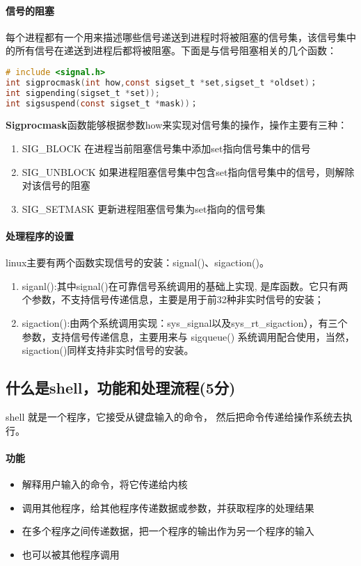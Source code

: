 \paragraph{信号的阻塞}每个进程都有一个用来描述哪些信号递送到进程时将被阻塞的信号集，该信号集中的所有信号在递送到进程后都将被阻塞。下面是与信号阻塞相关的几个函数：

\begin{lstlisting}[language = c]
# include <signal.h>
int sigprocmask(int how,const sigset_t *set,sigset_t *oldset)；
int sigpending(sigset_t *set));
int sigsuspend(const sigset_t *mask))；
\end{lstlisting}

\textbf{Sigprocmask}函数能够根据参数how来实现对信号集的操作，操作主要有三种：

\begin{enumerate}
    \item SIG\_BLOCK	在进程当前阻塞信号集中添加set指向信号集中的信号
    \item SIG\_UNBLOCK	如果进程阻塞信号集中包含set指向信号集中的信号，则解除对该信号的阻塞
    \item SIG\_SETMASK	更新进程阻塞信号集为set指向的信号集
\end{enumerate}

\paragraph{处理程序的设置}linux主要有两个函数实现信号的安装：signal()、sigaction()。
\begin{enumerate}
\item siganl():其中signal()在可靠信号系统调用的基础上实现, 是库函数。它只有两个参数，不支持信号传递信息，主要是用于前32种非实时信号的安装；
\item sigaction():由两个系统调用实现：sys\_signal以及sys\_rt\_sigaction），有三个参数，支持信号传递信息，主要用来与 sigqueue() 系统调用配合使用，当然，sigaction()同样支持非实时信号的安装。
\end{enumerate}

\subsection{什么是shell，功能和处理流程(5分)}
shell 就是一个程序，它接受从键盘输入的命令， 然后把命令传递给操作系统去执行。
\paragraph{功能}
\begin{itemize}
    \item 解释用户输入的命令，将它传递给内核
    \item 调用其他程序，给其他程序传递数据或参数，并获取程序的处理结果
    \item 在多个程序之间传递数据，把一个程序的输出作为另一个程序的输入
    \item 也可以被其他程序调用
\end{itemize}

